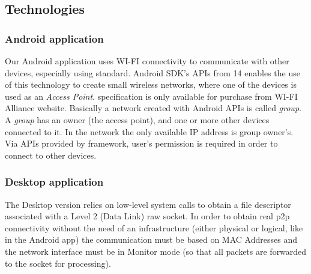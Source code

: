 \subsection{Technologies}

\subsubsection{Android application}
Our Android application uses WI-FI connectivity to communicate with other devices, especially using \direct standard. Android SDK's APIs from 14 enables the use of this technology to create small wireless networks, where one of the devices is used as an \emph{Access Point}. \direct specification is only available for purchase from WI-FI Alliance\textsuperscript{\texttrademark} website\cite{wifi_direct}.
Basically a network created with Android \direct APIs is called \emph{group}. A \emph{group} has an owner (the access point), and one or more other devices connected to it. In the network the only available IP address is group owner's. 
Via APIs provided by \direct framework, user's permission is required in order to connect to other devices.

\subsubsection{Desktop application}
The Desktop version relies on low-level system calls to obtain a file descriptor associated with a Level 2 (Data Link) raw socket. In order to obtain real p2p connectivity without the need of an infrastructure (either physical or logical, like in the Android app) the communication must be based on MAC Addresses and the network interface must be in Monitor mode (so that all packets are forwarded to the socket for processing).
